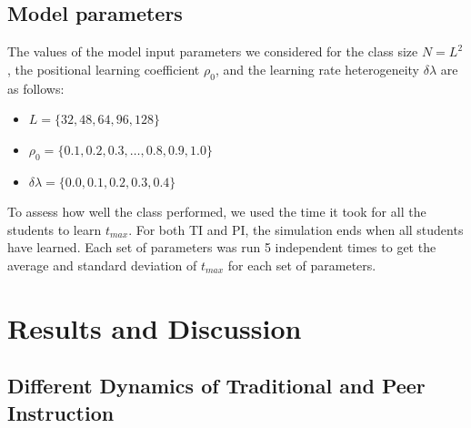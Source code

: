 \documentclass[twocolumn,secnumarabic,amssymb, nobibnotes, aps, prd]{revtex4-2}
\begin{document}
    \subsection{Model parameters}
        The values of the model input parameters we considered for the class size $N=L^2$, the positional learning coefficient $\rho_0$, and the learning rate heterogeneity $\delta\lambda$ are as follows:

        \begin{itemize}
            \item $L=\lbrace32,48,64,96,128\rbrace$
            \item $\rho_0=\lbrace0.1, 0.2, 0.3,\dots, 0.8, 0.9, 1.0\rbrace$
            \item $\delta\lambda=\lbrace0.0, 0.1, 0.2, 0.3, 0.4\rbrace$
        \end{itemize}

        To assess how well the class performed, we used the time it took for all the students to learn $t_{max}$.
        For both TI and PI, the simulation ends when all students have learned.
        Each set of parameters was run 5 independent times to get the average and standard deviation of $t_{max}$ for each set of parameters.




\section{Results and Discussion}

    \subsection{Different Dynamics of Traditional and Peer Instruction}
        
\end{document}
